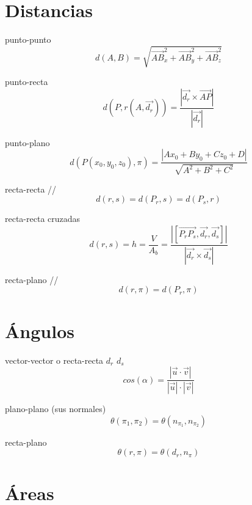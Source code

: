 \documentclass[12pt, letterpaper, twoside]{article}
\begin{document}
	\section{Distancias}
	
	punto-punto
	\begin{equation}
		d(A, B) = \sqrt{\vec{AB}_{x}^2 + \vec{AB}_{y}^2 + \vec{AB}_{z}^2}
	\end{equation}

	punto-recta
	\begin{equation}
		d(P, r(A, \vec{d_r})) = \frac{|\vec{d_r} \times \vec{AP}|}{|\vec{d_r}|}
	\end{equation}

	punto-plano
	\begin{equation}
		d(P(x_0, y_0, z_0), \pi) = \frac{|Ax_0 + By_0 + Cz_0 + D|}{\sqrt{A^2 + B^2 + C^2}}
	\end{equation}

	recta-recta //
	\begin{equation}
		d(r, s) = d(P_r, s) = d(P_s, r)
	\end{equation}

	recta-recta cruzadas
	\begin{equation}
		d(r, s) = h = \frac{V}{A_b} = \frac{|[\vec{P_r P_s}, \vec{d_r}, \vec{d_s}]|}{|\vec{d_r} \times \vec{d_s}|}
	\end{equation}

	recta-plano //
	\begin{equation}
		d(r, \pi) = d(P_r, \pi)
	\end{equation}

	
	\section{Ángulos}
	
	vector-vector o recta-recta $d_r$ $d_s$
	\begin{equation}
		cos(\alpha) = \frac{|\vec{u} \cdot \vec{v}|}{|\vec{u}| \cdot |\vec{v}|}
	\end{equation}

	plano-plano (sus normales)
	\begin{equation}
		\theta(\pi_1, \pi_2) = \theta(n_{\pi_1}, n_{\pi_2})
	\end{equation}

	recta-plano
	\begin{equation}
		\theta(r, \pi) = \theta(d_r, n_\pi)
	\end{equation}

	\section{Áreas}
	
\end{document}
